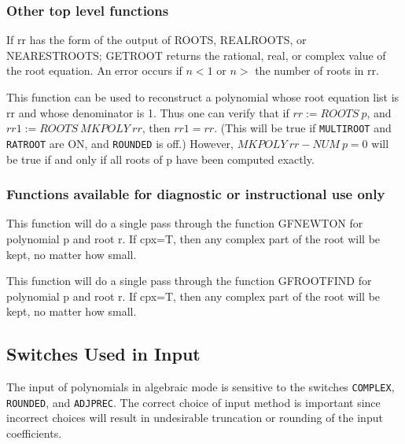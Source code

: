 \subsubsection{Other top level functions}

\begin{description}
   
\item[GETROOT(n,rr);] If rr has the form of the output of ROOTS, REALROOTS,
or NEARESTROOTS; GETROOT returns the rational, real, or complex value of
the root equation.  An error occurs if $n<1$ or $n>$ the number of roots in
rr.

\item[MKPOLY rr;] This function can be used to reconstruct a polynomial
whose root equation list is rr and whose denominator is 1.  Thus one can
verify that if $rr := ROOTS~p$, and $rr1 := ROOTS~MKPOLY~rr$, then
$rr1 = rr$. (This will be true if {\tt MULTIROOT} and {\tt RATROOT} are ON,
and {\tt ROUNDED} is off.)
However, $MKPOLY~rr - NUM~p = 0$ will be true if and only if all roots of p
have been computed exactly.

\end{description}

\subsubsection{Functions available for diagnostic or instructional use only}

\begin{description}
\item[GFNEWT(p,r,cpx);] This function will do a single pass through the
function GFNEWTON for polynomial p and root r.  If cpx=T, then any
complex part of the root will be kept, no matter how small.

\item[GFROOT(p,r,cpx);] This function will do a single pass through the
function GFROOTFIND for polynomial p and root r.  If cpx=T, then any
complex part of the root will be kept, no matter how small.
\end{description}
\subsection{Switches Used in Input}

The input of polynomials in algebraic mode is sensitive to the switches
{\tt COMPLEX}, {\tt ROUNDED}, and {\tt ADJPREC}.  The correct choice of
input method is important since incorrect choices will result in
undesirable truncation or rounding of the input coefficients.

